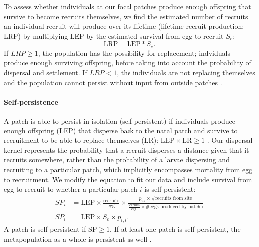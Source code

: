 \documentclass[12pt, oneside]{article}   	%
\begin{document}

To assess whether individuals at our focal patches produce enough offspring that survive to become recruits themselves, we find the estimated number of recruits an individual recruit will produce over its lifetime (lifetime recruit production: LRP) by multiplying LEP by the estimated survival from egg to recruit $S_e$:
\begin{equation}
\text{LRP} = \text{LEP} * S_e. \label{EQN_LRP}
\end{equation}
If $LRP \geq 1$, the population has the possibility for replacement; indviduals produce enough surviving offspring, before taking into account the probability of dispersal and settlement. If $LRP < 1$, the individuals are not replacing themselves and the population cannot persist without input from outside patches .%

\paragraph*{Self-persistence}

A patch is able to persist in isolation (self-persistent) if individuals produce enough offspring (LEP) that disperse back to the natal patch and survive to recruitment to be able to replace themselves (LR): $\text{LEP} \times \text{LR} \geq 1$ \citep{burgess2014beyond}. Our dispersal kernel represents the probability that a recruit disperses a distance given that it recruits somewhere, rather than the probability of a larvae dispersing and recruiting to a particular patch, which implicitly encompasses mortality from egg to recruitment. We modify the equation to fit our data and include survival from egg to recruit to whether a particular patch $i$ is self-persistent: 
\begin{equation}
\begin{split}
SP_i &= \text{LEP} \times \frac{\text{recruits}}{\text{egg}} \times \frac{p_{i,i} \times \text{\# recruits from site}}{\frac{\text{recruits}}{\text{egg}} \times \text{\# eggs produced by patch i}} \\ 
SP_i &= \text{LEP} \times S_e \times p_{i,i}. \label{EQN_SP}
\end{split}
\end{equation}
A patch is self-persistent if $\text{SP} \geq 1$. If at least one patch is self-persistent, the metapopulation as a whole is persistent as well \citep{hastings_persistence_2006, burgess2014beyond}.
\end{document}
